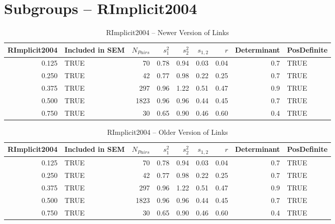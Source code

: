 \documentclass{article}\usepackage{graphicx, color}
\begin{document}
\section{Subgroups --  RImplicit2004 }%
\begin{table}[ht]
\centering
\begin{tabular}{rlrrrrrrl}
  \hline
RImplicit2004 & Included in SEM & $N_{Pairs}$ & $s_1^2$ & $s_2^2$ & $s_{1,2}$ & $r$ & Determinant & PosDefinite \\ 
  \hline
0.125 & TRUE & 70 & 0.78 & 0.94 & 0.03 & 0.04 & 0.7 & TRUE \\ 
  0.250 & TRUE & 42 & 0.77 & 0.98 & 0.22 & 0.25 & 0.7 & TRUE \\ 
  0.375 & TRUE & 297 & 0.96 & 1.22 & 0.51 & 0.47 & 0.9 & TRUE \\ 
  0.500 & TRUE & 1823 & 0.96 & 0.96 & 0.44 & 0.45 & 0.7 & TRUE \\ 
  0.750 & TRUE & 30 & 0.65 & 0.90 & 0.46 & 0.60 & 0.4 & TRUE \\ 
   \hline
\end{tabular}
\caption{RImplicit2004 -- Newer Version of Links} 
\end{table}
\begin{table}[ht]
\centering
\begin{tabular}{rlrrrrrrl}
  \hline
RImplicit2004 & Included in SEM & $N_{Pairs}$ & $s_1^2$ & $s_2^2$ & $s_{1,2}$ & $r$ & Determinant & PosDefinite \\ 
  \hline
0.125 & TRUE & 70 & 0.78 & 0.94 & 0.03 & 0.04 & 0.7 & TRUE \\ 
  0.250 & TRUE & 42 & 0.77 & 0.98 & 0.22 & 0.25 & 0.7 & TRUE \\ 
  0.375 & TRUE & 297 & 0.96 & 1.22 & 0.51 & 0.47 & 0.9 & TRUE \\ 
  0.500 & TRUE & 1823 & 0.96 & 0.96 & 0.44 & 0.45 & 0.7 & TRUE \\ 
  0.750 & TRUE & 30 & 0.65 & 0.90 & 0.46 & 0.60 & 0.4 & TRUE \\ 
   \hline
\end{tabular}
\caption{RImplicit2004 -- Older Version of Links} 
\end{table}


\end{document}

